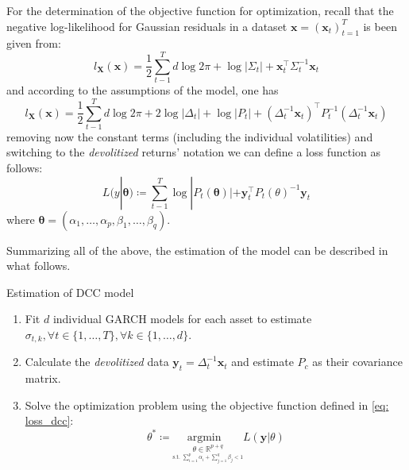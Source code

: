 \documentclass[a4paper, oneside]{discothesis}
\begin{document}
  \begin{mdframed}\begin{remark}
For the determination of the objective function for optimization, recall that the negative log-likelihood for Gaussian residuals in a dataset $\mathbf{x} = (\mathbf{x}_t)_{t=1}^T$ is been given from:
\[l_{\mathbf{X}}(\mathbf{x}) = \frac{1}{2}\sum_{t-1}^T d\log2\pi+\log|\Sigma_t|+\mathbf{x}_t^\intercal\Sigma_t^{-1}\mathbf{x}_t\]
and according to the assumptions of the model, one has
\[l_{\mathbf{X}}(\mathbf{x}) = \frac{1}{2}\sum_{t-1}^T d\log2\pi+2\log|\Delta_t|+\log|P_t|+(\Delta_t^{-1}\mathbf{x}_t)^\intercal P_t^{-1}(\Delta_t^{-1}\mathbf{x}_t)\]
removing now the constant terms (including the individual volatilities) and switching to the \textit{devolitized} returns' notation we can define a loss function as follows:
\begin{equation}\label{eq: loss_dcc}
    L(y| \boldsymbol{\theta}) \coloneqq \sum_{t-1}^T \log|P_t(\boldsymbol{\theta})|+\mathbf{y}_t^\intercal P_t(\theta)^{-1}\mathbf{y}_t
\end{equation}
where $\boldsymbol{\theta} = (\alpha_1, \dots, \alpha_p, \beta_1, \dots, \beta_q)$.
\end{remark}\end{mdframed}  

Summarizing all of the above, the estimation of the model can be described in what follows.
\begin{algorithm}
\caption{Estimation of DCC model}
\begin{algorithmic}
\State\begin{enumerate}
    \item Fit $d$ individual GARCH models for each asset to estimate $\sigma_{t, k}, \forall t\in \{1, \dots, T\},\forall k\in\{1, \dots, d\}$.
    \item Calculate the \textit{devolitized} data $\mathbf{y}_t = \Delta_t^{-1}\mathbf{x}_t$ and estimate $P_c$ as their covariance matrix. 
    \item Solve the optimization problem using the objective function defined in \ref{eq: loss_dcc}:
    \[\theta^*\coloneqq\underset{\underset{\text{s.t. }\sum_{i=1}^p \alpha_i + \sum_{j=1}^q \beta_j<1}{\theta\in\mathbb{R}^{p+q}}}{\mathrm{argmin\text{   }     }}L(\mathbf{y}|\theta)\]
    
    \end{enumerate}
\end{algorithmic}
\end{algorithm}
\end{document}
